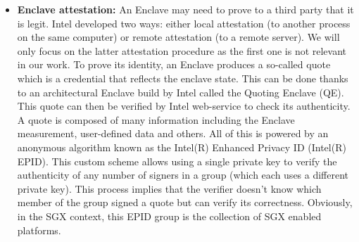 \documentclass[../main.tex]{subfiles}
\begin{document}
\begin{itemize}
    \item \textbf{Enclave attestation:} An Enclave may need to prove to a third party that it is legit. Intel developed two ways: either local attestation (to another process on the same computer) or remote attestation (to a remote server). We will only focus on the latter attestation procedure as the first one is not relevant in our work. To prove its identity, an Enclave produces a so-called quote which is a credential that reflects the enclave state. This can be done thanks to an architectural Enclave build by Intel called the Quoting Enclave (QE). This quote can then be verified by Intel web-service to check its authenticity. A quote is composed of many information including the Enclave measurement, user-defined data and others. All of this is powered by an anonymous algorithm known as the Intel(R) Enhanced Privacy ID (Intel(R) EPID). This custom scheme allows using a single private key to verify the authenticity of any number of signers in a group (which each uses a different private key). This process implies that the verifier doesn't know which member of the group signed a quote but can verify its correctness. Obviously, in the SGX context, this EPID group is the collection of SGX enabled platforms.
\end{itemize}
\end{document}
